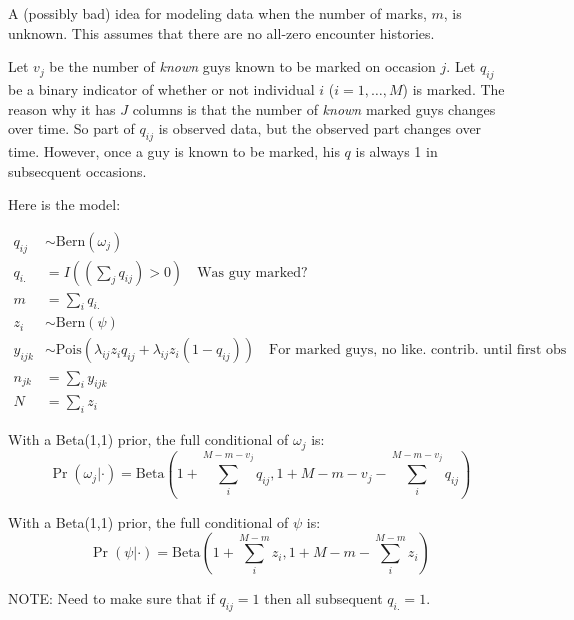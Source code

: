 \documentclass[12pt]{article}
\begin{document}
A (possibly bad) idea for modeling data when the number of marks, $m$, is
unknown. This assumes that there are no all-zero encounter histories.

Let $v_j$ be the number of \textit{known} guys known to be marked on
occasion $j$. Let $q_{ij}$ be a binary indicator of whether or not individual $i$
($i=1,\ldots,M$) is marked. The reason why it has $J$ columns is that
the number of \textit{known} marked guys changes over time. So part of
$q_{ij}$ is observed data, but the observed part changes over time.
However, once a
guy is known to be marked, his $q$ is always 1 in subsecquent occasions.

Here is the model:

\begin{align*}
q_{ij} &\sim \text{Bern}(\omega_j) \\
q_{i.} &= I((\sum_j q_{ij})>0) \quad \text{Was guy marked?}\\
m &= \sum_i q_{i.} \\
z_i &\sim \text{Bern}(\psi) \\
y_{ijk} &\sim
\text{Pois}(\lambda_{ij}z_{i}q_{ij} + \lambda_{ij}z_i(1-q_{ij})) \quad
\text{For marked guys, no like. contrib. until first obs}\\
n_{jk} &= \sum_i y_{ijk} \\
N &= \sum_i z_i
\end{align*}

With a Beta(1,1) prior, the full conditional of $\omega_j$ is:
\[
\Pr(\omega_j|\cdot) = \text{Beta}(1+\sum_i^{M-m-v_j} q_{ij}, 1+M-m-v_j-\sum_i^{M-m-v_j}q_{ij})
\]

With a Beta(1,1) prior, the full conditional of $\psi$ is:
\[
\Pr(\psi|\cdot) = \text{Beta}(1+\sum_i^{M-m} z_{i}, 1+M-m-\sum_i^{M-m}z_i)
\]

NOTE: Need to make sure that if $q_{ij}=1$ then all subsequent
$q_{i.}=1$.
\end{document}
